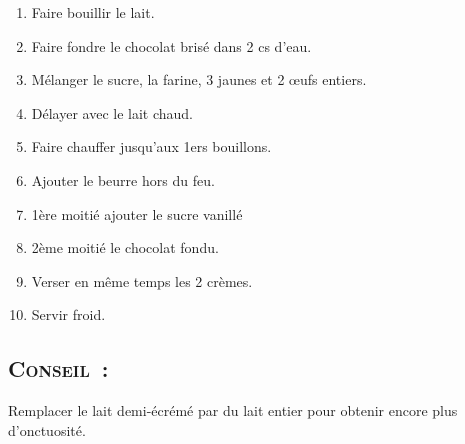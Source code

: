 \begin{enumerate}
\item Faire bouillir le lait.

\item Faire fondre le chocolat brisé dans 2 cs d’eau.

\item Mélanger le sucre, la farine, 3 jaunes et 2 œufs entiers.

\item Délayer avec le lait chaud.

\item Faire chauffer jusqu’aux 1ers bouillons.

\item Ajouter le beurre hors du feu.
\item 1ère moitié ajouter le sucre vanillé
\item 2ème moitié le chocolat fondu.
\item Verser en même temps les 2 crèmes.
\item Servir froid.
\end{enumerate}


\subsection*{\textsc{Conseil~:}}
Remplacer le lait demi-écrémé par du lait entier pour obtenir encore plus d'onctuosité.

